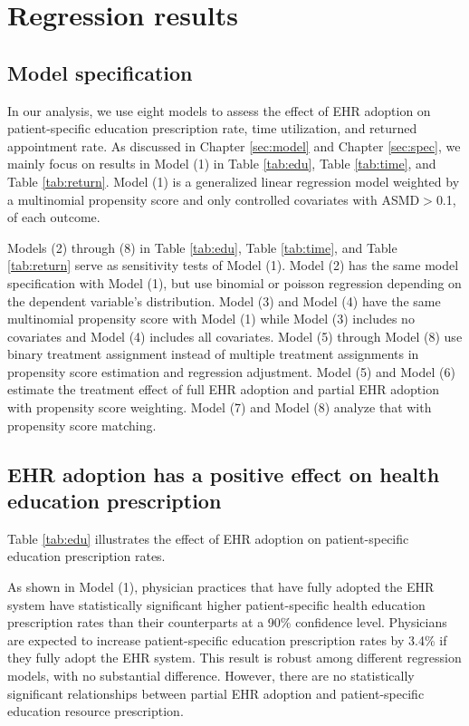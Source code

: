 \documentclass[12pt]{report}
\begin{document}
\chapter{Regression results}
\section{Model specification}
In our analysis, we use eight models to assess the effect of EHR adoption on patient-specific education prescription rate, time utilization, and returned appointment rate. As discussed in Chapter \ref{sec:model} and Chapter \ref{sec:spec}, we mainly focus on results in Model (1) in Table \ref{tab:edu}, Table \ref{tab:time}, and Table \ref{tab:return}. Model (1) is a generalized linear regression model weighted by a multinomial propensity score and only controlled covariates with ASMD$>$0.1, of each outcome. 

Models (2) through (8) in Table \ref{tab:edu}, Table \ref{tab:time}, and Table \ref{tab:return} serve as sensitivity tests of Model (1). Model (2) has the same model specification with Model (1), but use binomial or poisson regression depending on the dependent variable's distribution. Model (3) and Model (4) have the same multinomial propensity score with Model (1) while Model (3) includes no covariates and Model (4) includes all covariates. Model (5) through Model (8) use binary treatment assignment instead of multiple treatment assignments in propensity score estimation and regression adjustment. Model (5) and Model (6) estimate the treatment effect of full EHR adoption and partial EHR adoption with propensity score weighting. Model (7) and Model (8) analyze that with propensity score matching. 

\section{EHR adoption has a positive effect on health education prescription}
Table \ref{tab:edu} illustrates the effect of EHR adoption on patient-specific education prescription rates. 

As shown in Model (1), physician practices that have fully adopted the EHR system have statistically significant higher patient-specific health education prescription rates than their counterparts at a 90\% confidence level. Physicians are expected to increase patient-specific education prescription rates by 3.4\% if they fully adopt the EHR system. This result is robust among different regression models, with no substantial difference. However, there are no statistically significant relationships between partial EHR adoption and patient-specific education resource prescription. 
\end{document}
